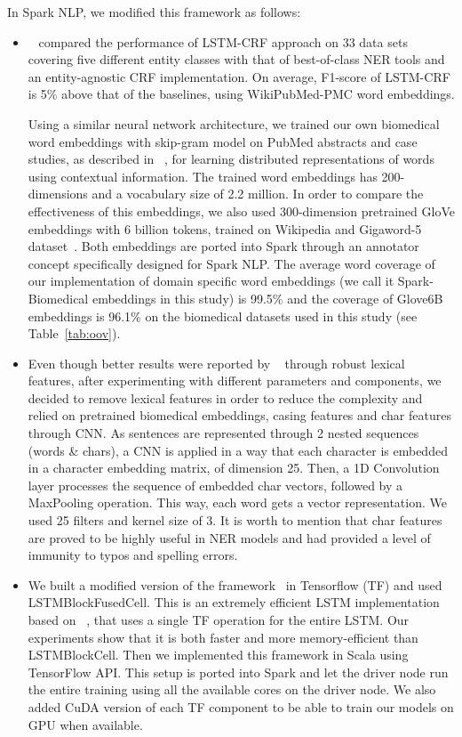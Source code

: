 \documentclass[a4paper,conference]{IEEEtran}
\begin{document}
In Spark NLP, we modified this framework as follows:

\begin{itemize}
\item ~\cite{habibi2017deep} compared the performance of LSTM-CRF approach on 33 data sets covering five different entity classes with that of best-of-class NER tools and an entity-agnostic CRF implementation. On average, F1-score of LSTM-CRF is 5\% above that of the baselines, using WikiPubMed-PMC word embeddings.

Using a similar neural network architecture, we trained our own biomedical word embeddings with skip-gram model on PubMed abstracts and case studies, as described in ~\cite{mikolov2013efficient}, for learning distributed representations of words using contextual information. The trained word embeddings has 200-dimensions and a vocabulary size of 2.2 million. In order to compare the effectiveness of this embeddings, we also used 300-dimension pretrained GloVe embeddings with 6 billion tokens, trained on Wikipedia and Gigaword-5 dataset~\cite{pennington2014glove}. Both embeddings are ported into Spark through an annotator concept specifically designed for Spark NLP. The average word coverage of our implementation of domain specific word embeddings (we call it Spark-Biomedical embeddings in this study) is 99.5\% and the coverage of Glove6B embeddings is 96.1\% on the biomedical datasets used in this study (see Table~\ref{tab:oov}).

\item Even though better results were reported by ~\cite{ghaddar2018robust} through robust lexical features, after experimenting with different parameters and components, we decided to remove lexical features in order to reduce the complexity and relied on pretrained biomedical embeddings, casing features and char features through CNN. As sentences are represented through 2 nested sequences (words \& chars), a CNN is applied in a way that each character is embedded in a character embedding matrix, of dimension 25. Then, a 1D Convolution layer processes the sequence of embedded char vectors, followed by a MaxPooling operation. This way, each word gets a vector representation. We used 25 filters and kernel size of 3. It is worth to mention that char features are proved to be highly useful in NER models and had provided a level of immunity to typos and spelling errors. 

\item We built a modified version of the framework~\cite{chiu2016named} in Tensorflow (TF) and used LSTMBlockFusedCell. This is an extremely efficient LSTM implementation based on ~\cite{zaremba2014recurrent}, that uses a single TF operation for the entire LSTM. Our experiments show that it is both faster and more memory-efficient than LSTMBlockCell. Then we implemented this framework in Scala using TensorFlow API. This setup is ported into Spark and let the driver node run the entire training using all the available cores on the driver node. We also added CuDA version of each TF component to be able to train our models on GPU when available.

\end{itemize}
\end{document}
